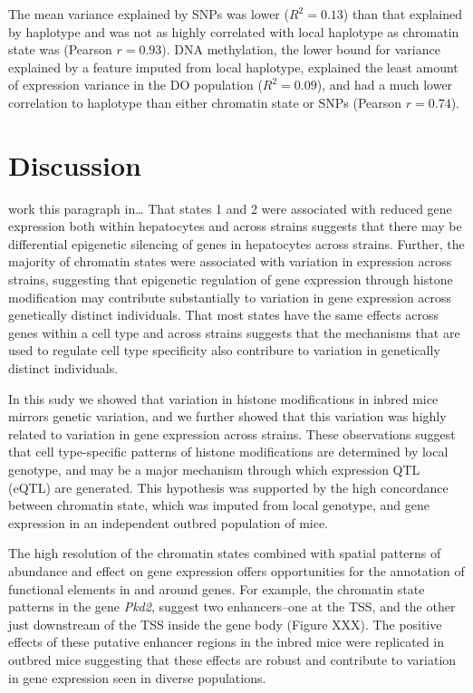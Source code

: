 \documentclass[10pt,letterpaper]{article}
\begin{document}
The mean variance explained by SNPs was lower (\(R^2 = 0.13\)) than that
explained by haplotype and was not as highly correlated with local
haplotype as chromatin state was (Pearson \(r = 0.93\)). DNA
methylation, the lower bound for variance explained by a feature imputed
from local haplotype, explained the least amount of expression variance
in the DO population (\(R^2 = 0.09\)), and had a much lower correlation
to haplotype than either chromatin state or SNPs (Pearson \(r = 0.74\)).

\hypertarget{discussion}{%
\section{Discussion}\label{discussion}}

work this paragraph in\ldots{} That states 1 and 2 were associated with
reduced gene expression both within hepatocytes and across strains
suggests that there may be differential epigenetic silencing of genes in
hepatocytes across strains. Further, the majority of chromatin states
were associated with variation in expression across strains, suggesting
that epigenetic regulation of gene expression through histone
modification may contribute substantially to variation in gene
expression across genetically distinct individuals. That most states
have the same effects across genes within a cell type and across strains
suggests that the mechanisms that are used to regulate cell type
specificity also contribure to variation in genetically distinct
individuals.

In this sudy we showed that variation in histone modifications in inbred
mice mirrors genetic variation, and we further showed that this
variation was highly related to variation in gene expression across
strains. These observations suggest that cell type-specific patterns of
histone modifications are determined by local genotype, and may be a
major mechanism through which expression QTL (eQTL) are generated. This
hypothesis was supported by the high concordance between chromatin
state, which was imputed from local genotype, and gene expression in an
independent outbred population of mice.

The high resolution of the chromatin states combined with spatial
patterns of abundance and effect on gene expression offers opportunities
for the annotation of functional elements in and around genes. For
example, the chromatin state patterns in the gene \textit{Pkd2}, suggest
two enhancers--one at the TSS, and the other just downstream of the TSS
inside the gene body (Figure XXX). The positive effects of these
putative enhancer regions in the inbred mice were replicated in outbred
mice suggesting that these effects are robust and contribute to
variation in gene expression seen in diverse populations.
\end{document}
